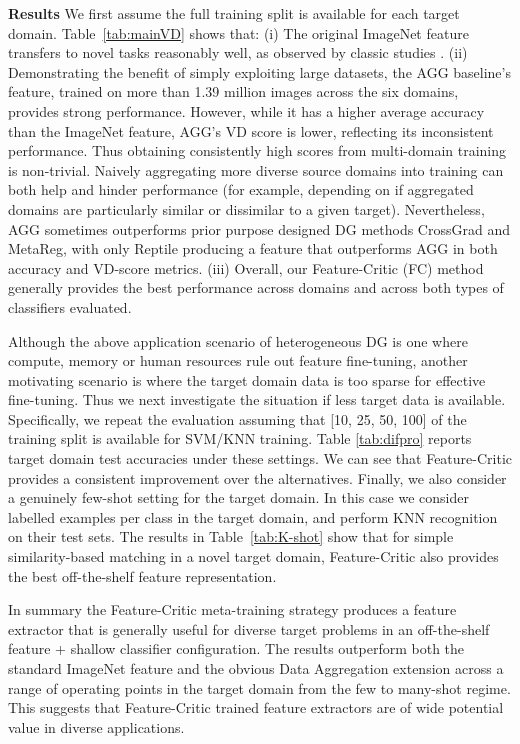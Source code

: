 \documentclass{article}
\newcommand{\modelname}{Feature-Critic}
\newcommand{\keypoint}[1]{\vspace{0.0cm}\noindent\textbf{#1}\quad}
\begin{document}
\keypoint{Results}
We first assume the full training split is available for each target domain. Table~\ref{tab:mainVD} shows that: (i) The original ImageNet feature transfers to novel tasks reasonably well, as observed by classic studies \cite{yosinski2014howTransferable}. (ii) Demonstrating the benefit of simply exploiting large datasets, the  AGG baseline's feature, trained on more than 1.39 million images across the six domains, provides strong performance. However, while it has a higher average accuracy than the ImageNet feature, AGG's VD score is lower, reflecting its inconsistent performance. Thus obtaining consistently high scores from multi-domain training is non-trivial. Naively aggregating more diverse source domains into training can both help and hinder performance (for example, depending on if aggregated domains are particularly similar or dissimilar to a given target). Nevertheless, AGG sometimes outperforms prior purpose designed DG methods CrossGrad and MetaReg, with only Reptile producing a feature that outperforms AGG in both accuracy and VD-score metrics. (iii) Overall, our  \modelname{} (FC) method generally provides the best performance across domains and across both types of classifiers evaluated. 

Although the above application scenario of heterogeneous DG is one where compute, memory or human resources rule out feature fine-tuning, another motivating scenario is where the target domain data is too sparse for effective fine-tuning. Thus we next investigate the situation if less target data is available. Specifically, we repeat the evaluation assuming that  [10, 25, 50, 100] of the training split is available for SVM/KNN training. Table \ref{tab:difpro} reports target domain test accuracies under these settings. We can see that \modelname{} provides a consistent improvement over the alternatives. Finally, we also consider a genuinely few-shot setting for the target domain. In this case we consider  labelled examples per class in the target domain, and perform KNN recognition on their test sets. The results in Table~\ref{tab:K-shot} show that for simple similarity-based matching in a novel target domain, \modelname{} also provides the best off-the-shelf feature representation.

In summary the \modelname{} meta-training strategy produces a feature extractor that is generally useful for diverse target problems in an off-the-shelf feature + shallow classifier configuration. The results outperform both the standard ImageNet feature and the obvious Data Aggregation extension across a range of operating points in the target domain from the few to many-shot regime. This suggests that \modelname{} trained feature extractors are of wide potential value in diverse applications.
\end{document}
